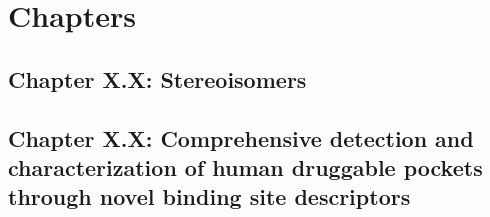 
\chapter{Chapters}
\newpage











\section{Chapter X.X: Stereoisomers}











\section{Chapter X.X: Comprehensive detection and characterization of human druggable pockets through novel binding site descriptors}




